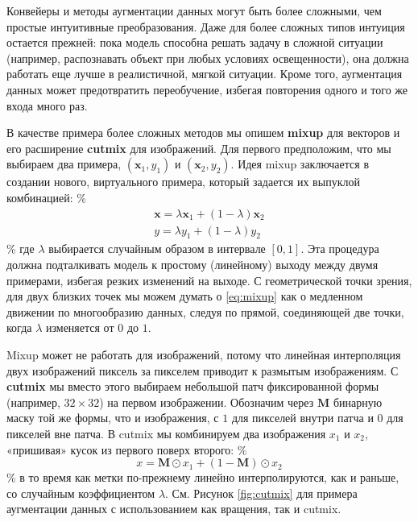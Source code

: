 Конвейеры и методы аугментации данных могут быть более сложными, чем простые интуитивные преобразования. Даже для более сложных типов интуиция остается прежней: пока модель способна решать задачу в сложной ситуации (например, распознавать объект при любых условиях освещенности), она должна работать еще лучше в реалистичной, мягкой ситуации. Кроме того, аугментация данных может предотвратить переобучение, избегая повторения одного и того же входа много раз.

В качестве примера более сложных методов мы опишем \textbf{mixup} \cite{zhang2017mixup} для векторов и его расширение \textbf{cutmix} \cite{yun2019cutmix} для изображений. Для первого предположим, что мы выбираем два примера, $(\mathbf{x}_1, y_1)$ и $(\mathbf{x}_2, y_2)$. Идея mixup заключается в создании нового, виртуального примера, который задается их выпуклой комбинацией:
\%
\begin{gather}
\mathbf{x}=\lambda\mathbf{x}_1+(1-\lambda)\mathbf{x}_2\\y=\lambda y_1+(1-\lambda)y_2
\label{eq:mixup}
\end{gather}
\%
где $\lambda$ выбирается случайным образом в интервале $[0,1]$. Эта процедура должна подталкивать модель к простому (линейному) выходу между двумя примерами, избегая резких изменений на выходе. С геометрической точки зрения, для двух близких точек мы можем думать о \eqref{eq:mixup} как о медленном движении по многообразию данных, следуя по прямой, соединяющей две точки, когда $\lambda$ изменяется от $0$ до $1$.

Mixup может не работать для изображений, потому что линейная интерполяция двух изображений пиксель за пикселем приводит к размытым изображениям. С \textbf{cutmix} мы вместо этого выбираем небольшой патч фиксированной формы (например, $32 \times 32$) на первом изображении. Обозначим через $\mathbf{M}$ бинарную маску той же формы, что и изображения, с $1$ для пикселей внутри патча и $0$ для пикселей вне патча. В cutmix мы комбинируем два изображения $x_1$ и $x_2$, «пришивая» кусок из первого поверх второго:
\%
$$
x=\mathbf{M}\odot x_1+(1-\mathbf{M})\odot x_2
$$
\%
в то время как метки по-прежнему линейно интерполируются, как и раньше, со случайным коэффициентом $\lambda$. См. Рисунок \ref{fig:cutmix} для примера аугментации данных с использованием как вращения, так и cutmix.

